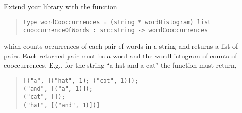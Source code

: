 \label{wordCoocurrence}
Extend your library with the function
\begin{quote}
  \mbox{\lstinline!type wordCooccurrences = (string * wordHistogram) list!}
  \\\mbox{\lstinline!cooccurrenceOfWords : src:string -> wordCooccurrences!}
\end{quote}
which counts occurrences of each pair of words in a string and
returns a list of pairs. Each returned pair must be a
word and the wordHistogram of counts of cooccurrences. E.g., for the
string ``a hat and a cat'' the function must return,
\begin{quote}
  \mbox{\lstinline![("a", [("hat", 1); ("cat", 1)]);!}
  \\\hspace*{.5em}\mbox{\lstinline!("and", [("a", 1)]);!}
  \\\hspace*{.5em}\mbox{\lstinline!("cat", []);!}
  \\\hspace*{.5em}\mbox{\lstinline!("hat", [("and", 1)])]!}
\end{quote}
